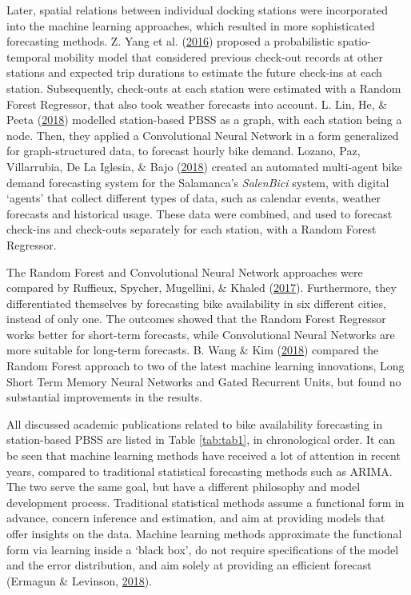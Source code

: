 \documentclass[12pt,oneside]{reedthesis}
\begin{document}
Later, spatial relations between individual docking stations were
incorporated into the machine learning approaches, which resulted in
more sophisticated forecasting methods. Z. Yang et al.
(\protect\hyperlink{ref-yang2016}{2016}) proposed a probabilistic
spatio-temporal mobility model that considered previous check-out
records at other stations and expected trip durations to estimate the
future check-ins at each station. Subsequently, check-outs at each
station were estimated with a Random Forest Regressor, that also took
weather forecasts into account. L. Lin, He, \& Peeta
(\protect\hyperlink{ref-lin2018}{2018}) modelled station-based PBSS as a
graph, with each station being a node. Then, they applied a
Convolutional Neural Network in a form generalized for graph-structured
data, to forecast hourly bike demand. Lozano, Paz, Villarrubia, De La
Iglesia, \& Bajo (\protect\hyperlink{ref-lozano2018}{2018}) created an
automated multi-agent bike demand forecasting system for the Salamanca's
\emph{SalenBici} system, with digital `agents' that collect different
types of data, such as calendar events, weather forecasts and historical
usage. These data were combined, and used to forecast check-ins and
check-outs separately for each station, with a Random Forest Regressor.

The Random Forest and Convolutional Neural Network approaches were
compared by Ruffieux, Spycher, Mugellini, \& Khaled
(\protect\hyperlink{ref-ruffieux2017}{2017}). Furthermore, they
differentiated themselves by forecasting bike availability in six
different cities, instead of only one. The outcomes showed that the
Random Forest Regressor works better for short-term forecasts, while
Convolutional Neural Networks are more suitable for long-term forecasts.
B. Wang \& Kim (\protect\hyperlink{ref-wang2018}{2018}) compared the
Random Forest approach to two of the latest machine learning
innovations, Long Short Term Memory Neural Networks and Gated Recurrent
Units, but found no substantial improvements in the results.

All discussed academic publications related to bike availability
forecasting in station-based PBSS are listed in Table \ref{tab:tab1}, in
chronological order. It can be seen that machine learning methods have
received a lot of attention in recent years, compared to traditional
statistical forecasting methods such as ARIMA. The two serve the same
goal, but have a different philosophy and model development process.
Traditional statistical methods assume a functional form in advance,
concern inference and estimation, and aim at providing models that offer
insights on the data. Machine learning methods approximate the
functional form via learning inside a `black box', do not require
specifications of the model and the error distribution, and aim solely
at providing an efficient forecast (Ermagun \& Levinson,
\protect\hyperlink{ref-ermagun2018}{2018}).
\end{document}
